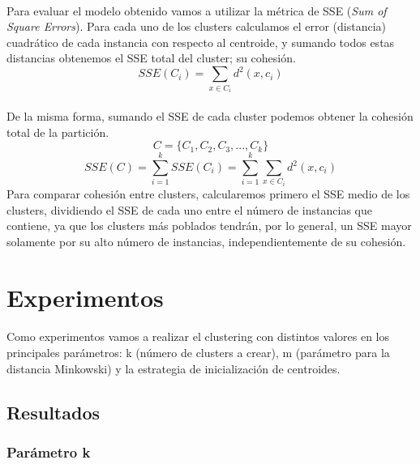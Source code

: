 \documentclass[10pt,a4paper]{article}
\begin{document}
	\paragraph{}
	Para evaluar el modelo obtenido vamos a utilizar la métrica de SSE (\textit{Sum of Square Errors}). Para cada uno de los clusters calculamos el error (distancia) cuadrático de cada instancia con respecto al centroide, y sumando todos estas distancias obtenemos el SSE total del cluster; su cohesión.
	\begin{equation}
		SSE(C_i) = \sum_{x \in C_i} d^2(x, c_i)
	\end{equation}
	\paragraph{}
	De la misma forma, sumando el SSE de cada cluster podemos obtener la cohesión total de la partición.
		$$C = \{C_1, C_2, C_3, ..., C_k\}$$
	\begin{equation}
		SSE(C) = \sum^{k}_{i=1} SSE(C_i) = \sum^{k}_{i=1} \sum_{x \in C_i} d^2(x, c_i)
	\end{equation}
	Para comparar cohesión entre clusters, calcularemos primero el SSE medio de los clusters, dividiendo el SSE de cada uno entre el número de instancias que contiene, ya que los clusters más poblados tendrán, por lo general, un SSE mayor solamente por su alto número de instancias, independientemente de su cohesión.
	
\section{Experimentos}
	\paragraph{}
	Como experimentos vamos a realizar el clustering con distintos valores en los principales parámetros: k (número de clusters a crear), m (parámetro para la distancia Minkowski) y la estrategia de inicialización de centroides.
	
	\subsection{Resultados}	
	\subsubsection{Parámetro k}
\end{document}
